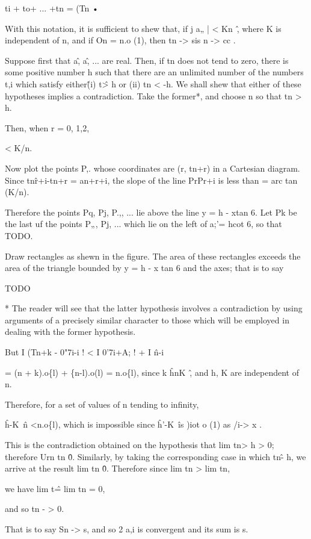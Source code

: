ti + to+ ... +tn = (Tn •

With this notation, it is sufficient to shew that, if j a„ | < Kn~\^,
where K is independent of n, and if On = n.o (1), then tn -> sis n ->
cc .

Suppose first that a\^, a\^, ... are real. Then, if tn does not tend
to zero, there is some positive number h such that there are an
unlimited number of the numbers t,i which satisfy either\^ (i) t\^ > h
or (ii) tn < -h. We shall shew that either of these hypotheses implies
a contradiction. Take the former*, and choose n so that tn > h.

Then, when r = 0, 1,2,

< K/n.

Now plot the points P,. whose coordinates are (r, tn+r) in a Cartesian
diagram. Since tn\^r+i-tn+r = an+r+i, the slope of the line PrPr+i is
less than = arc tan (K/n).

Therefore the points Pq, Pj, P.,, ... lie above the line y = h - xtan
6. Let Pk be the last uf the points P„, Pj, ... which lie on the left
of a;'= hcot 6, so that TODO.

Draw rectangles as shewn in the figure. The area of these rectangles
exceeds the area of the triangle bounded by y = h - x tan 6 and the
axes; that is to say

TODO

* The reader will see that the latter hypothesis involves a
contradiction by using arguments of a precisely similar character to
those which will be employed in dealing with the former hypothesis.

%
%

But I (Tn+k - 0"7i-i ! < I 0'7i+A; ! + I \^n-i \

= (n + k).o\{l) + \{n-l).o(l) = n.o\{l), since k \^ hnK~\^, and h, K
are independent of n.

Therefore, for a set of values of n tending to infinity,

\^h-K~\^n <n.o\{l), which is impossible since \^h'-K~\^ is )iot o (1)
as /i-> x .

This is the contradiction obtained on the hypothesis that lim tn> h >
0; therefore Urn tn \^ 0. Similarly, by taking the corresponding case
in which tn\^ - h, we arrive at the result lim tn \^ 0. Therefore
since lim tn > lim tn,

we have lim t\^ = lim tn = 0,

and so tn - > 0.

That is to say Sn -> s, and so 2 a,i is convergent and its sum is s.

